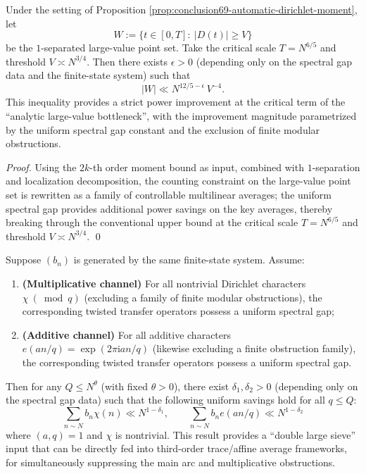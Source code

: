 \begin{theorem}\label{thm:conclusion70-critical-interval-structure-improvement}
Under the setting of Proposition \ref{prop:conclusion69-automatic-dirichlet-moment},
let
\[
W:=\{t\in[0,T]:\ |D(t)|\ge V\}
\]
be the \(1\)-separated large-value point set.
Take the critical scale \(T=N^{6/5}\) and threshold \(V\asymp N^{3/4}\).
Then there exists \(\epsilon>0\) (depending only on the spectral gap data and the finite-state system) such that
\[
\boxed{\;
|W|\ll N^{12/5-\epsilon}\,V^{-4}.\;}
\]
This inequality provides a strict power improvement at the critical term of the ``analytic large-value bottleneck'', with the improvement magnitude parametrized by the uniform spectral gap constant and the exclusion of finite modular obstructions.
\end{theorem}

\begin{proof}
Using the \(2k\)-th order moment bound as input, combined with \(1\)-separation and localization decomposition, the counting constraint on the large-value point set is rewritten as a family of controllable multilinear averages; the uniform spectral gap provides additional power savings on the key averages, thereby breaking through the conventional upper bound at the critical scale \(T=N^{6/5}\) and threshold \(V\asymp N^{3/4}\). \qed
\end{proof}

\begin{proposition}\label{prop:conclusion74-double-large-sieve-input}
Suppose \((b_n)\) is generated by the same finite-state system.
Assume:
\begin{enumerate}
  \item \textbf{(Multiplicative channel)} For all nontrivial Dirichlet characters \(\chi\ (\bmod q)\) (excluding a family of finite modular obstructions), the corresponding twisted transfer operators possess a uniform spectral gap;
  \item \textbf{(Additive channel)} For all additive characters \(e(an/q)=\exp(2\pi\mathrm{i}an/q)\) (likewise excluding a finite obstruction family), the corresponding twisted transfer operators possess a uniform spectral gap.
\end{enumerate}
Then for any \(Q\le N^\theta\) (with fixed \(\theta>0\)), there exist \(\delta_1,\delta_2>0\) (depending only on the spectral gap data) such that the following uniform savings hold for all \(q\le Q\):
\[
\boxed{\;
\sum_{n\sim N} b_n\chi(n)\ll N^{1-\delta_1},\qquad
\sum_{n\sim N} b_n e(an/q)\ll N^{1-\delta_2}\;}
\]
where \((a,q)=1\) and \(\chi\) is nontrivial.
This result provides a ``double large sieve'' input that can be directly fed into third-order trace/affine average frameworks, for simultaneously suppressing the main arc and multiplicative obstructions.
\end{proposition}

